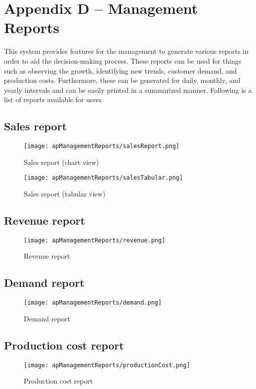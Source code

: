 \documentclass[12pt]{report}
\begin{document}
\setcounter{chapter}{4}
\setcounter{section}{0}
\setcounter{figure}{0}
\chapter*{\Huge Appendix D – Management Reports}
This system provides features for the management to generate various reports in order to aid the decision-making process. These reports can be used for things such as observing the growth, identifying new trends, customer demand, and production costs. Furthermore, these can be generated for daily, monthly, and yearly intervals and can be easily printed in a summarized manner. Following is a list of reports available for users.

\section{Sales report}
\begin{figure}[H]
	\centering
	\texttt{[image: apManagementReports/salesReport.png]}
	\caption{Sales report (chart view)}
\end{figure}

\begin{figure}[H]
	\centering
	\texttt{[image: apManagementReports/salesTabular.png]}
	\caption{Sales report (tabular view)}
\end{figure}

\section{Revenue report}
\begin{figure}[H]
	\centering
	\texttt{[image: apManagementReports/revenue.png]}
	\caption{Revenue report}
\end{figure}

\section{Demand report}
\begin{figure}[H]
	\centering
	\texttt{[image: apManagementReports/demand.png]}
	\caption{Demand report}
\end{figure}

\section{Production cost report}
\begin{figure}[H]
	\centering
	\texttt{[image: apManagementReports/productionCost.png]}
	\caption{Production cost report}
\end{figure}
\end{document}

